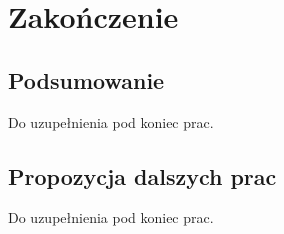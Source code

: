 \chapter{Zakończenie}
\label{Chapter9}

\section{Podsumowanie}
\label{Chapter91}

{\color{red}Do uzupełnienia pod koniec prac.}

\section{Propozycja dalszych prac}
\label{Chapter92}

{\color{red}Do uzupełnienia pod koniec prac.}
